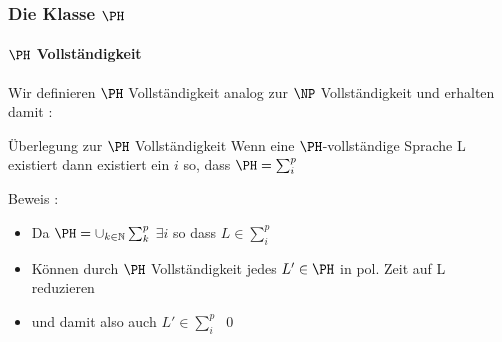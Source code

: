 \begin{frame}
	\frametitle{Die Klasse $\PH$}
	\framesubtitle{$\PH$ Vollst\"andigkeit}
	
	Wir definieren $\PH$ Vollst\"andigkeit analog zur $\NP$ Vollständigkeit und
	erhalten damit :
	\pause
	\bigskip
	
	\begin{KITinfoblock}{Überlegung zur $\PH$ Vollst\"andigkeit}
		Wenn eine $\PH$-vollst\"andige Sprache L existiert dann existiert ein $i$
		so, dass $\PH = \sum_{i}^{p}$
	\end{KITinfoblock}
	\bigskip
	\pause
	Beweis :
	\begin{itemize}[<+->]
	  \item Da $\PH = \cup_{k \in \mathbb{N}} \sum_{k}^{p}$   $\exists i$ so dass
	  $L \in \sum_{i}^{p}$
	  \item K\"onnen durch $\PH$ Vollständigkeit jedes $L' \in \PH$ in pol. Zeit
	  auf L reduzieren
	  \item und damit also auch $L' \in \sum_{i}^{p}$	\qed
	\end{itemize}
	
\end{frame}